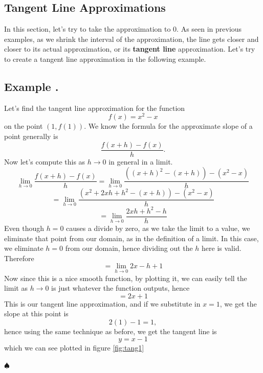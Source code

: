 \documentclass[11pt]{article}
\numberwithin{lemma}{section}
\numberwithin{equation}{section}
\numberwithin{define}{section}
\numberwithin{prop}{section}
\numberwithin{figure}{section}
\numberwithin{thm}{section}
\numberwithin{cor}{section}
\newcounter{ex}[section]
\newenvironment{ex}[0]{

	\refstepcounter{ex}
    \subsection*{Example \theex .}
    }
    {
    \hfill$\spadesuit$
    \par
    }
\numberwithin{ex}{section}
\begin{document}
\subsection{Tangent Line Approximations}
In this section, let's try to take the approximation to 0. As seen in previous examples, as we shrink the interval of the approximation, the line gets closer and closer to its actual approximation, or its \textbf{tangent line} approximation. Let's try to create a tangent line approximation in the following example.
\begin{ex}
	Let's find the tangent line approximation for the function
	$$f(x)=x^2-x$$
	on the point $(1,f(1))$.
	We know the formula for the approximate slope of a point generally is
	$$\frac{f(x+h)-f(x)}{h}.$$
	Now let's compute this as $h\to0$ in general in a limit. 
	$$\lim_{h\to0}\frac{f(x+h)-f(x)}{h}=\lim_{h\to0}\frac{((x+h)^2-(x+h))-(x^2-x)}{h}$$
	$$=\lim_{h\to0}\frac{(x^2+2xh+h^2-(x+h))-(x^2-x)}{h}$$
	$$=\lim_{h\to0}\frac{2xh+h^2-h}{h}$$
	Even though $h=0$ causes a divide by zero, as we take the limit to a value, we eliminate that point from our domain, as in the definition of a limit. In this case, we eliminate $h=0$ from our domain, hence dividing out the $h$ here is valid. Therefore
	$$=\lim_{h\to0}2x-h+1$$
	Now since this is a nice smooth function, by plotting it, we can easily tell the limit as $h\to0$ is just whatever the function outputs, hence
	$$=2x+1$$
	This is our tangent line approximation, and if we substitute in $x=1$, we get the slope at this point is 
	$$2(1)-1=1,$$
	hence using the same technique as before, we get the tangent line is
	$$y=x-1$$
	which we can see plotted in figure \eqref{fig:tang1}
	\begin{figure}
	\centering
		\caption{}
		\label{fig:tang1}
	\end{figure}
	\label{ex:tan1}
\end{ex}
\end{document}
